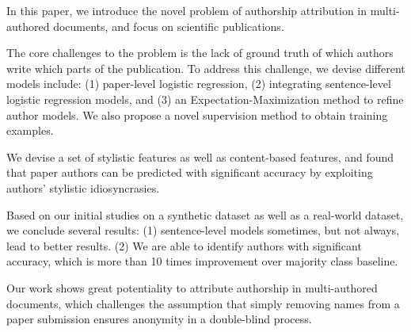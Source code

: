 
In this paper, we introduce the novel problem of authorship
attribution in multi-authored documents, and focus on scientific
publications. 

The core challenges to the problem is the lack of ground truth of which authors write which parts of the publication. To address this challenge,
we devise different models include: (1) paper-level logistic regression, (2) integrating sentence-level logistic regression models, and (3) an Expectation-Maximization method to refine author models. We also propose a novel supervision method to obtain training examples.

We devise a set of stylistic features as well as content-based features, and found that paper authors can be predicted with significant accuracy by exploiting authors' stylistic idiosyncrasies.

Based on our initial studies on a synthetic dataset as well as a real-world dataset, we conclude several results: (1) sentence-level models sometimes, but not always, lead to better results. 
(2) We are able to identify authors with significant accuracy, which is more than 10 times improvement over majority class baseline. 

Our work shows great potentiality to attribute authorship in multi-authored documents, which challenges the assumption that simply removing names from a paper submission ensures anonymity in a double-blind process.